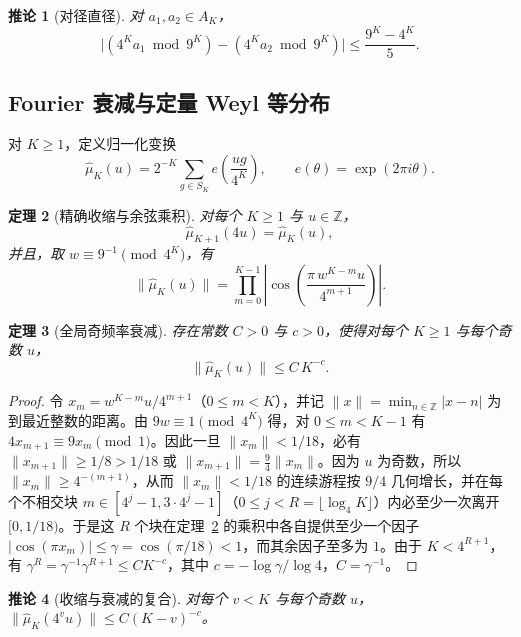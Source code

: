 \documentclass[11pt,a4paper]{article}
\newtheorem{theorem}{定理}[section]
\newtheorem{corollary}[theorem]{推论}
\theoremstyle{remark}
\newcommand{\Z}{\mathbb{Z}}
\begin{document}
\begin{corollary}[对径直径]
\label{cor:antipodal}
对 $a_{1}, a_{2} \in A_{K}$，
\[
  \bigl|(4^{K} a_{1} \bmod 9^{K}) - (4^{K} a_{2} \bmod 9^{K})\bigr| \le \frac{9^{K} - 4^{K}}{5}.
\]
\end{corollary}

\subsection{Fourier 衰减与定量 Weyl 等分布}

对 $K \ge 1$，定义归一化变换
\begin{equation}
  \hat\mu_{K}(u) = 2^{-K} \sum_{g \in S_{K}} e\!\left(\frac{u g}{4^{K}}\right), \qquad e(\theta) = \exp(2\pi i \theta).
\end{equation}

\begin{theorem}[精确收缩与余弦乘积]
\label{thm:contraction}
对每个 $K \ge 1$ 与 $u \in \Z$，
\[
  \hat\mu_{K+1}(4u) = \hat\mu_{K}(u),
\]
并且，取 $w \equiv 9^{-1} \pmod{4^{K}}$，有
\[
  \bigl\|\hat\mu_{K}(u)\bigr\|
  = \prod_{m=0}^{K-1} \left|\cos\!\left(\frac{\pi\, w^{K-m} u}{4^{m+1}}\right)\right|.
\]
\end{theorem}

\begin{theorem}[全局奇频率衰减]
\label{thm:94global}
存在常数 $C > 0$ 与 $c > 0$，使得对每个 $K \ge 1$ 与每个奇数 $u$，
\[
  \|\hat\mu_{K}(u)\| \le C\, K^{-c}.
\]
\end{theorem}

\begin{proof}
令 $x_{m} = w^{K-m} u / 4^{m+1}$（$0 \le m < K$），并记 $\|x\| = \min_{n \in \Z} |x - n|$ 为到最近整数的距离。由 $9 w \equiv 1 \pmod{4^{K}}$ 得，对 $0 \le m < K - 1$ 有 $4 x_{m+1} \equiv 9 x_{m} \pmod 1$。因此一旦 $\|x_{m}\| < 1/18$，必有 $\|x_{m+1}\| \ge 1/8 > 1/18$ 或 $\|x_{m+1}\| = \tfrac94 \|x_{m}\|$。因为 $u$ 为奇数，所以 $\|x_{m}\| \ge 4^{-(m+1)}$，从而 $\|x_{m}\| < 1/18$ 的连续游程按 $9/4$ 几何增长，并在每个不相交块 $m \in [4^{j} - 1, 3 \cdot 4^{j} - 1]$（$0 \le j < R = \lfloor \log_{4} K \rfloor$）内必至少一次离开 $[0, 1/18)$。于是这 $R$ 个块在定理~\ref{thm:contraction} 的乘积中各自提供至少一个因子 $|\cos(\pi x_{m})| \le \gamma = \cos(\pi/18) < 1$，而其余因子至多为 $1$。由于 $K < 4^{R+1}$，有 $\gamma^{R} = \gamma^{-1} \gamma^{R+1} \le C K^{-c}$，其中 $c = -\log \gamma / \log 4$，$C = \gamma^{-1}$。
\end{proof}

\begin{corollary}[收缩与衰减的复合]
对每个 $v < K$ 与每个奇数 $u$，$\|\hat\mu_{K}(4^{v} u)\| \le C (K-v)^{-c}$。
\end{corollary}
\end{document}

